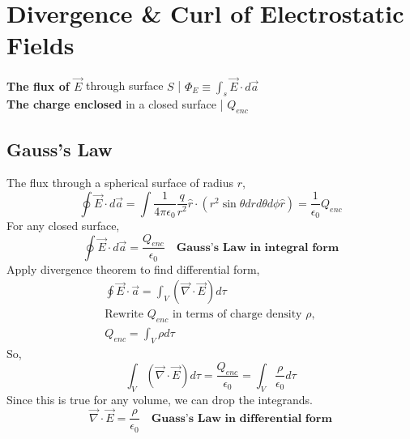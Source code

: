 \documentclass{article}
\def\cc{{\frac{1}{4\pi\epsilon_0}}}
\def\qenc{{Q_{enc}}}
\def\pofs{{\epsilon_0}} %
\begin{document}
\section*{Divergence \& Curl of Electrostatic Fields}
    \textbf{The flux of $\vec{E}$} through surface $S$ | $\Phi_E \equiv \int_s \vec{E} \cdot d\vec{a}$\\
    \textbf{The charge enclosed} in a closed surface | $Q_{enc}$
    \subsection*{Gauss's Law}
        The flux through a spherical surface of radius $r$,
        \begin{equation}
            \oint \vec{E} \cdot d\vec{a} = \int \cc \frac{q}{r^2}\hat{r} \cdot (r^2\sin\theta drd\theta d\phi\hat{r}) = \frac{1}{\pofs}\qenc
        \end{equation}
        For any closed surface,
        \begin{equation}
            \boxed{\oint \vec{E} \cdot d\vec{a} = \frac{\qenc}{\pofs}} \quad\textbf{Gauss's Law in integral form}
        \end{equation}
        Apply divergence theorem to find differential form,
        \begin{gather*}
            \oint \vec{E} \cdot \vec{a} = \int_V (\vec{\nabla} \cdot \vec{E})d\tau\\
            \text{Rewrite $\qenc$ in terms of charge density $\rho$},\\
            \qenc = \int_V \rho d\tau
        \end{gather*}
        So,
        \begin{equation*}
            \int_V (\vec{\nabla} \cdot \vec{E})d\tau = \frac{\qenc}{\pofs} = \int_V \frac{\rho}{\pofs} d\tau
        \end{equation*}
        Since this is true for any volume, we can drop the integrands.
        \begin{equation}
            \boxed{\vec{\nabla} \cdot \vec{E} = \frac{\rho}{\pofs}} \quad \textbf{Guass's Law in differential form}
        \end{equation}
\end{document}
